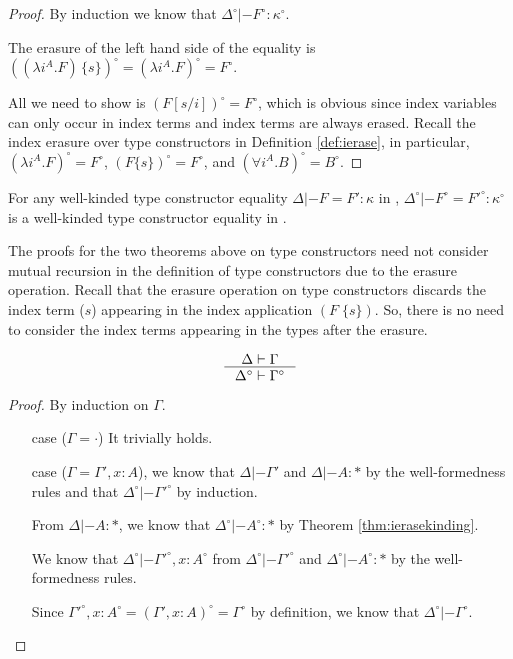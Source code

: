 \begin{proof}
By induction we know that $\Delta^\circ |- F^\circ : \kappa^\circ$.

The erasure of the left hand side of the equality is\\
$((\lambda i^A.F)\,\{s\})^\circ = (\lambda i^A.F)^\circ = F^\circ$.

All we need to show is $(F[s/i])^\circ = F^\circ$, which is obvious
since index variables can only occur in index terms and index terms
are always erased. Recall the index erasure over type constructors in
Definition \ref{def:ierase}, in particular, $(\lambda i^A.F)^\circ=F^\circ$,
$(F\{s\})^\circ=F^\circ$, and $(\forall i^A.B)^\circ=B^\circ$.
\end{proof}
\begin{remark}
For any well-kinded type constructor equality $\Delta |- F=F':\kappa$ in \Fi,
$\Delta^\circ|- F^\circ=F'^\circ:\kappa^\circ$ is
a well-kinded type constructor equality in \Fw.
\end{remark}


The proofs for the two theorems above on type constructors need not consider
mutual recursion in the definition of type constructors due to
the erasure operation. Recall that the erasure operation on type constructors
discards the index term ($s$) appearing in the index application $(F\;\{s\})$.
So, there is no need to consider the index terms appearing in the types after
the erasure.

\begin{theorem}
\label{thm:ierasetmctx}
\[ \inference{\Delta |- \Gamma}{\Delta^\circ |- \Gamma^\circ} \]
\end{theorem}
\begin{proof}
By induction on $\Gamma$.
\begin{itemize}
\item[case] ($\Gamma=\cdot$) It trivially holds.
\item[case] ($\Gamma = \Gamma',x:A$),
we know that  $\Delta |- \Gamma'$ and $\Delta |- A:*$
by the well-formedness rules
and that $\Delta^\circ |- \Gamma'^\circ$ by induction.

From $\Delta |- A:*$, we know that $\Delta^\circ |- A^\circ :*$
by Theorem \ref{thm:ierasekinding}.

We know that $\Delta^\circ |- \Gamma'^\circ,x:A^\circ$
from $\Delta^\circ |- \Gamma'^\circ$ and $\Delta^\circ |- A^\circ :*$
by the well-formedness rules.

Since $\Gamma'^\circ,x:A^\circ = (\Gamma',x:A)^\circ = \Gamma^\circ$
by definition, we know that $\Delta^\circ |- \Gamma^\circ$.
\end{itemize}\vspace*{-10pt}
\end{proof}

